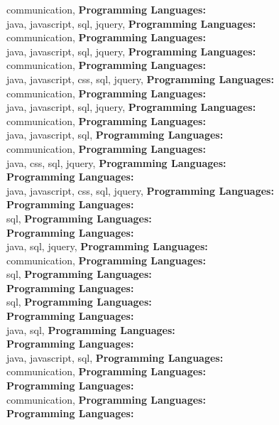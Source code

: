 communication, \textbf{Programming Languages:} \\
java, javascript, sql, jquery, \textbf{Programming Languages:} \\
communication, \textbf{Programming Languages:} \\
java, javascript, sql, jquery, \textbf{Programming Languages:} \\
communication, \textbf{Programming Languages:} \\
java, javascript, css, sql, jquery, \textbf{Programming Languages:} \\
communication, \textbf{Programming Languages:} \\
java, javascript, sql, jquery, \textbf{Programming Languages:} \\
communication, \textbf{Programming Languages:} \\
java, javascript, sql, \textbf{Programming Languages:} \\
communication, \textbf{Programming Languages:} \\
java, css, sql, jquery, \textbf{Programming Languages:} \\
\textbf{Programming Languages:} \\
java, javascript, css, sql, jquery, \textbf{Programming Languages:} \\
\textbf{Programming Languages:} \\
sql, \textbf{Programming Languages:} \\
\textbf{Programming Languages:} \\
java, sql, jquery, \textbf{Programming Languages:} \\
communication, \textbf{Programming Languages:} \\
sql, \textbf{Programming Languages:} \\
\textbf{Programming Languages:} \\
sql, \textbf{Programming Languages:} \\
\textbf{Programming Languages:} \\
java, sql, \textbf{Programming Languages:} \\
\textbf{Programming Languages:} \\
java, javascript, sql, \textbf{Programming Languages:} \\
communication, \textbf{Programming Languages:} \\
\textbf{Programming Languages:} \\
communication, \textbf{Programming Languages:} \\
\textbf{Programming Languages:} \\
